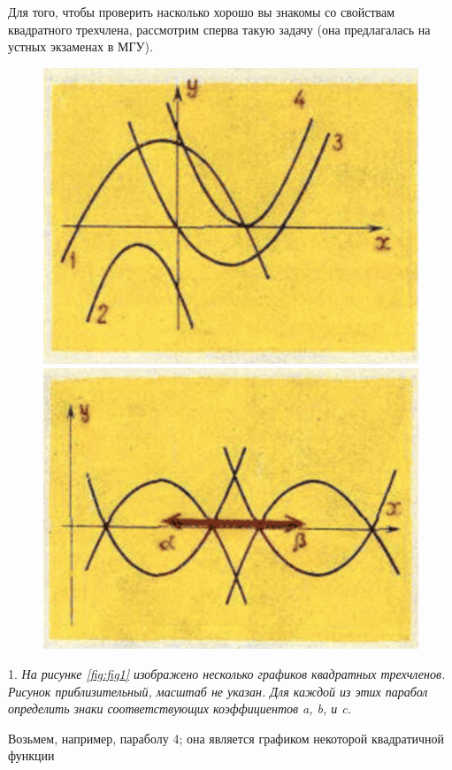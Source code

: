 \documentclass[main.tex]{subfiles}
\begin{document}
Для того, чтобы проверить насколько хорошо вы знакомы со свойствам квадратного трехчлена, рассмотрим сперва такую задачу (она предлагалась на устных экзаменах в МГУ).

\begin{figure}[!htb]
   \begin{minipage}{0.48\textwidth}
     \centering
     \includegraphics[width=.7\linewidth]{fig1}
     \caption{}\label{Fig:Data1}
   \end{minipage}\hfill
   \begin{minipage}{0.48\textwidth}
     \centering
     \includegraphics[width=.7\linewidth]{fig2}
     \caption{}\label{Fig:Data2}
   \end{minipage}
\end{figure}

1. \textit{На рисунке \ref{fig:fig1} изображено несколько графиков квадратных трехчленов. Рисунок приблизительный, масштаб не указан. Для каждой из этих парабол определить знаки соответствующих коэффициентов a, b, и c.}

Возьмем, например, параболу 4; она является графиком некоторой квадратичной функции
\end{document}
